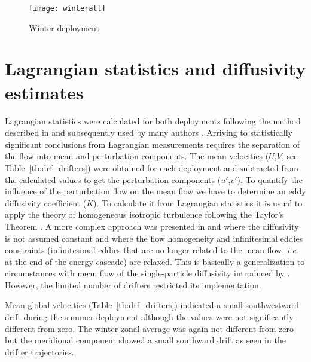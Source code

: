 \begin{figure}
\centering %
\texttt{[image: winterall]}%
\caption{Winter deployment}%
\label{fig:drf_winterall}%
\end{figure}

\section{Lagrangian statistics and diffusivity estimates}

Lagrangian statistics were calculated for both deployments
following the method described in \citet{Davis85} and subsequently
used by many authors \citep[e.g.][]{Haynes91,Salas01}. Arriving to
statistically significant conclusions from Lagrangian measurements
requires the separation of the flow into mean and perturbation
components. The mean velocities ($U$,$V$, see
Table~\ref{tb:drf_drifters}) were obtained for each deployment and
subtracted from the calculated values to get the perturbation
components ($u'$,$v'$). To quantify the influence of the
perturbation flow on the mean flow we have to determine an eddy
diffusivity coefficient ($K$). To calculate it from Lagrangian
statistics it is usual to apply the theory of homogeneous
isotropic turbulence following the Taylor's Theorem
\citep{Taylor21}. A more complex approach was presented in
\citet{Davis87} and \citet{Davis91} where the diffusivity is not
assumed constant and where the flow homogeneity and infinitesimal
eddies constraints (infinitesimal eddies that are no longer
related to the mean flow, \emph{i.e.} at the end of the energy
cascade) are relaxed. This is basically a generalization to
circumstances with mean flow of the single-particle diffusivity
introduced by \citet{Taylor21}. However, the limited number of
drifters restricted its implementation.

Mean global velocities (Table~\ref{tb:drf_drifters}) indicated a
small southwestward drift during the summer deployment although
the values were not significantly different from zero. The winter
zonal average was again not different from zero but the meridional
component showed a small southward drift as seen in the drifter
trajectories.

